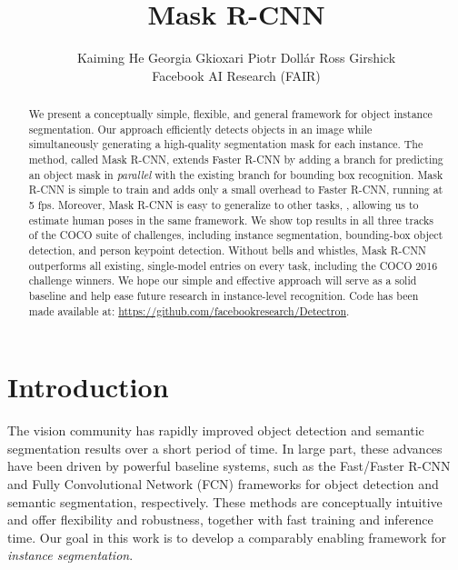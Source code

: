 \documentclass[10pt,twocolumn,letterpaper]{article}
\begin{document}
\title{Mask R-CNN}

\author{
 Kaiming He \quad Georgia Gkioxari \quad Piotr Doll\'ar \quad Ross Girshick \vspace{3mm}\\
 Facebook AI Research (FAIR) \vspace{-2mm}
}
\maketitle

\begin{abstract}
We present a conceptually simple, flexible, and general framework for object instance segmentation. Our approach efficiently detects objects in an image while simultaneously generating a high-quality segmentation mask for each instance. The method, called Mask R-CNN, extends Faster R-CNN by adding a branch for predicting an object mask in \emph{parallel} with the existing branch for bounding box recognition. Mask R-CNN is simple to train and adds only a small overhead to Faster R-CNN, running at 5 fps. Moreover, Mask R-CNN is easy to generalize to other tasks, \eg, allowing us to estimate human poses in the same framework. We show top results in all three tracks of the COCO suite of challenges, including instance segmentation, bounding-box object detection, and person keypoint detection. Without bells and whistles, Mask R-CNN outperforms all existing, single-model entries on every task, including the COCO 2016 challenge winners. We hope our simple and effective approach will serve as a solid baseline and help ease future research in instance-level recognition. Code has been made available at: \url{https://github.com/facebookresearch/Detectron}.
\end{abstract}

\section{Introduction}

The vision community has rapidly improved object detection and semantic segmentation results over a short period of time. In large part, these advances have been driven by powerful baseline systems, such as the Fast/Faster R-CNN \cite{Girshick2015a,Ren2015a} and Fully Convolutional Network (FCN) \cite{Long2015} frameworks for object detection and semantic segmentation, respectively. These methods are conceptually intuitive and offer flexibility and robustness, together with fast training and inference time. Our goal in this work is to develop a comparably enabling framework for \emph{instance segmentation}.
\end{document}
